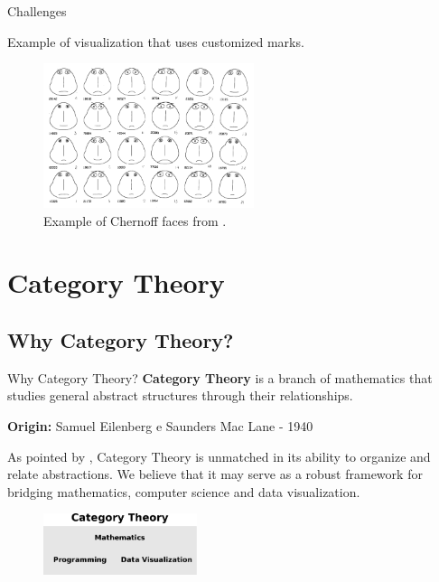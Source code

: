 \documentclass[aspectratio=169,xcolor=dvipsnames,9pt]{beamer}
\begin{document}
\begin{frame}[fragile]{Challenges}

	Example of visualization that uses customized marks.
	\begin{figure}[H]
		\begin{center}
			\includegraphics[width=0.55\textwidth]{./figures/chernoff_face.png}
		\end{center}
		\caption{Example of Chernoff faces from \citet{chernoff1973use}.}
		\label{fig:chernofffaces}
	\end{figure}

\end{frame}

\section[Category Theory]{Category Theory}
\subsection{Why Category Theory?}
\begin{frame}[fragile]{Why Category Theory?}
	\textbf{Category Theory} is a branch of mathematics that
	studies general abstract structures through their relationships.
	\vspace{3mm}

	\textbf{Origin: }Samuel Eilenberg e Saunders Mac Lane - 1940
	\vspace{3mm}

	As pointed by \citet{fong2019invitation}, Category Theory is unmatched
	in its ability to organize and relate abstractions. We believe that
	it may serve as a robust framework for bridging mathematics, computer science and data visualization.

	\vspace{3mm}
	\begin{figure}[H]
		\begin{center}
			\includegraphics[width=0.40\textwidth]{./figures/category-triad.pdf}
		\end{center}
	\end{figure}
\end{frame}
\end{document}

